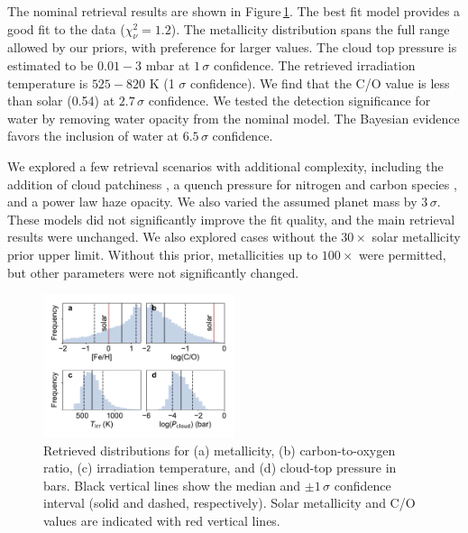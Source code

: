 \documentclass[twocolumn, trackchanges]{aastex61}
\begin{document}

The nominal retrieval results are shown in Figure\,\ref{fig:retrieval}.  The best fit model provides a good fit to the data ($\chi^2_\nu = 1.2$).  The metallicity distribution spans the full range allowed by our priors, with preference for larger values. The cloud top pressure is estimated to be $0.01 - 3$ mbar at $1\,\sigma$ confidence. The retrieved irradiation temperature is $525 - 820$ K (1 $\sigma$ confidence).  We find that the C/O value is less than solar (0.54) at $2.7\,\sigma$ confidence.  We tested the detection significance for water by removing water opacity from the nominal model. The Bayesian evidence favors the inclusion of water at $6.5\,\sigma$ confidence. 

We explored a few retrieval scenarios with additional complexity, including the addition of cloud patchiness \citep{line16}, a quench pressure for nitrogen and carbon species \citep[e.g.][]{morley17}, and a power law haze opacity.  We also varied the assumed planet mass by $3\,\sigma$. These models did not significantly improve the fit quality, and the main retrieval results were unchanged.  We also explored cases without the $30\times$ solar metallicity prior upper limit. Without this prior, metallicities up to $100\times$ were permitted, but other parameters were not significantly changed. 

\begin{figure}
\includegraphics[width = 0.5\textwidth]{Figures/fig4_retrieval.pdf}
\caption{Retrieved distributions for (a) metallicity, (b) carbon-to-oxygen ratio, (c) irradiation temperature, and (d) cloud-top pressure in bars. Black vertical lines show the median and $\pm1\,\sigma$ confidence interval (solid and dashed, respectively). Solar metallicity and C/O values are indicated with red vertical lines.}  \label{fig:retrieval}
\end{figure}
\end{document}
